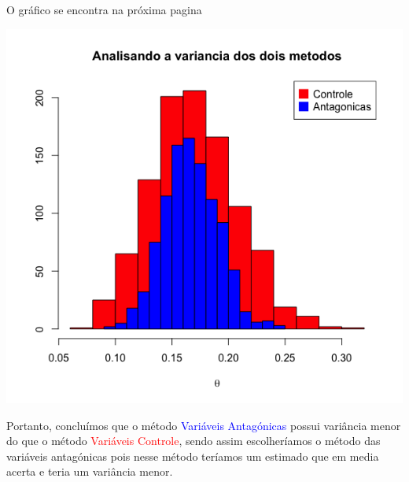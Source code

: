 \documentclass[11pt,a4paper]{article}
\begin{document}
O gráfico se encontra na próxima pagina

\begin{center}
\includegraphics[width=.5\linewidth]{Grafico.png}
\end{center}

Portanto, concluímos que o método \textcolor{blue}{Variáveis Antagónicas} possui variância menor do que o método  \textcolor{red}{Variáveis Controle}, sendo assim escolheríamos o método das variáveis antagónicas pois nesse método teríamos um estimado que em media acerta e teria um variância menor.
\end{document}
